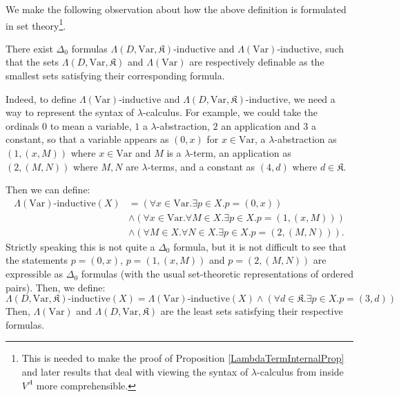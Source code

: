 \documentclass{lmcs}
\newcommand{\Var}{\ensuremath{\mathrm{Var}}}
\newcommand{\Const}{\mathfrak{K}}
\newcommand{\form}[1]{\mathrm{#1}} %
\newcommand{\hInductive}[1]{{#1}\text{-}\form{inductive}}
\begin{document}
We make the following observation about how the above definition is formulated in set theory\footnote{This is needed to make the proof of Proposition \ref{LambdaTermInternalProp} and later results that deal with viewing the syntax of $\lambda$-calculus from inside $V^A$ more comprehensible. }. 
\begin{exa}
	\label{SetTheoryFormulationExample}
	There exist $\Delta_0$ formulas $\hInductive{\Lambda(D,\Var,\Const)}$ and $\hInductive{\Lambda(\Var)}$, such that the sets $\Lambda(D,\Var,\Const)$ and $\Lambda(\Var)$ are respectively definable as the smallest sets satisfying their corresponding formula. 

Indeed, to define $\hInductive{\Lambda(\Var)}$ and $\hInductive{\Lambda(D,\Var,\Const)}$, we need a way to represent the syntax of $\lambda$-calculus. For example, we could take the ordinals $0$ to mean a variable, $1$ a $\lambda$-abstraction, $2$ an application and $3$ a constant, so that a variable appears as $(0,x)$ for $x \in \Var$, a $\lambda$-abstraction as $(1,(x,M))$ where $x \in \Var$ and $M$ is a $\lambda$-term, an application as $(2, (M,N))$ where $M,N$ are $\lambda$-terms, and a constant as $(4,d)$ where $d \in \Const$. 
	
Then we can define:
	\begin{align*}
		\hInductive{\Lambda(\Var)}(X) &= (\forall x \in \Var. \exists p \in X. p = (0,x)) \\
		&\land (\forall x \in \Var. \forall M \in X. \exists p \in X. p = (1,(x,M))) \\
		& \land (\forall M \in X. \forall N \in X. \exists p \in X. p = (2, (M,N))).
	\end{align*}
Strictly speaking this is not quite a $\Delta_0$ formula, but it is not difficult to see that the statements $p = (0,x)$, $p = (1,(x,M))$ and $p = (2,(M,N))$ are expressible as $\Delta_0$ formulas (with the usual set-theoretic representations of ordered pairs). Then, we define:
	\[
	\hInductive{\Lambda(D,\Var,\Const)}(X) = \hInductive{\Lambda(\Var)}(X) \land (\forall d \in \Const. \exists p \in X. p = (3,d))
	\]
	Then, $\Lambda(\Var)$ and $\Lambda(D,\Var,\Const)$ are the least sets satisfying their respective formulas. 
\end{exa}
\end{document}
